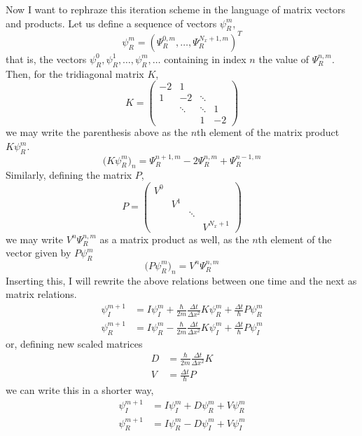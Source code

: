 \documentclass[10pt,a4paper]{article}
\begin{document}
Now I want to rephraze this iteration scheme in the language of matrix vectors and products. Let us define a sequence of vectors $\psi_R^{m}$,
\begin{equation}
	\psi_R^{m} = ( \Psi_R^{0,m}, \ldots , \Psi_R^{N_x + 1,m} ) ^T
\end{equation}
that is, the vectors $\psi_R^0, \psi_R^1, \ldots , \psi_R^m, \ldots$ containing in index $n$ the value of $\Psi_R^{n,m}$. Then, for the tridiagonal matrix $K$,
\begin{equation}
	K
	=
	\left(
	\begin{matrix}
		-2 &  1 &   &\\
		 1 & -2 & \ddots &\\
		   &  \ddots & \ddots &1\\
		   &    & 1 & -2
	\end{matrix}
	\right)
\end{equation}
we may write the parenthesis above as the $n$th element of the matrix product $K\psi_R^m$.
\begin{equation}
	\Big(K \psi_R^m\Big)_n
	=
	\Psi_R^{n+1,m} - 2\Psi_R^{n,m} + \Psi_R^{ n-1,m}
\end{equation}
Similarly, defining the matrix $P$,
\begin{equation}
	P
	=
	\left(
	\begin{matrix}
		V^0 &  &   &\\
		 & V^1 &  &\\
		   &  & \ddots &\\
		   &    & & V^{N_x + 1}
	\end{matrix}
	\right)
\end{equation}
we may write $V^n\Psi_R^{n,m}$ as a matrix product as well, as the $n$th element of the vector given by $P \psi_R^m$
\begin{equation}
	\Big(P \psi_R^m\Big)_n
	=
	V^n\Psi_R^{n,m}
\end{equation}
Inserting this, I will rewrite the above relations between one time and the next as matrix relations.
\begin{align}
	\psi_I^{m+1}
	&=
	I \psi_I^m
	+
	\frac{\hbar}{2m}\frac{\Delta t}{\Delta x ^2}
	K \psi_R^m
	+
	\frac{\Delta t}{\hbar}
	P \psi_R^m\\
	\psi_R^{m+1}
	&=
	I \psi_R^m
	-
	\frac{\hbar}{2m}\frac{\Delta t}{\Delta x ^2}
	K \psi_I^m
	+
	\frac{\Delta t}{\hbar}
	P \psi_I^m
\end{align}
or, defining new scaled matrices
\begin{align}
	D &= \frac{\hbar}{2m}\frac{\Delta t}{\Delta x ^2} K\\
	V &= \frac{\Delta t}{\hbar} P
\end{align}
we can write this in a shorter way,
\begin{align}
	\psi_I^{m+1}
	&=
	I \psi_I^m
	+
	D \psi_R^m
	+
	V \psi_R^m\\
	\psi_R^{m+1}
	&=
	I \psi_R^m
	-
	D \psi_I^m
	+
	V \psi_I^m
\end{align}
\end{document}
